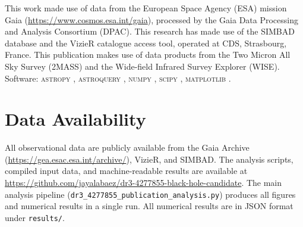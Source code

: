 \documentclass[usenatbib,fleqn]{mnras}
\begin{document}
This work made use of data from the European Space Agency (ESA)
mission Gaia (\url{https://www.cosmos.esa.int/gaia}), processed by
the Gaia Data Processing and Analysis Consortium (DPAC).
This research has made use of the SIMBAD database and the VizieR
catalogue access tool, operated at CDS, Strasbourg, France.
This publication makes use of data products from the Two Micron All
Sky Survey (2MASS) and the Wide-field Infrared Survey Explorer
(WISE).  Software: \textsc{astropy} \citep{Astropy2022},
\textsc{astroquery} \citep{Astroquery2019}, \textsc{numpy}
\citep{Harris2020}, \textsc{scipy} \citep{Virtanen2020},
\textsc{matplotlib} \citep{Hunter2007}.

\section*{Data Availability}

All observational data are publicly available from the Gaia Archive
(\url{https://gea.esac.esa.int/archive/}), VizieR, and SIMBAD.
The analysis scripts, compiled input data, and machine-readable
results are available at
\url{https://github.com/jayalabaez/dr3-4277855-black-hole-candidate}.
The main analysis pipeline
(\texttt{dr3\_4277855\_publication\_analysis.py}) produces all
figures and numerical results in a single run.  All numerical
results are in JSON format under \texttt{results/}.




\end{document}
